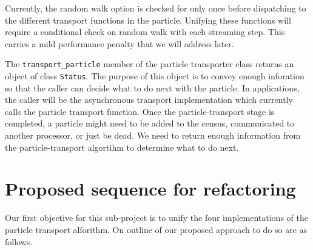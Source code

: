 \documentclass[memo]{ResearchNote}
\begin{document}
Currently, the random walk option is checked for only once before
dispatching to the different transport functions in the particle.
Unifying these functions will require a conditional check on random
walk with each streaming step. This carries a mild performance penalty
that we will address later.

The {\tt transport\_particle} member of the particle transporter class
returns an object of class {\tt Status}. The purpose of this object is
to convey enough inforation so that the caller can decide what to do
next with the particle. In applications, the caller will be the
asynchronous transport implementation which currently calls the
particle transport function. Once the particle-transport stage is
completed, a particle might need to be added to the census,
communicated to another processor, or just be dead. We need to return
enough information from the particle-transport algortihm to determine
what to do next. 

\section{Proposed sequence for refactoring}

Our first objective for this sub-project is to unify the four
implementations of the particle transport alforithm. On outline of our
proposed approach to do so are as follows.
\end{document}

